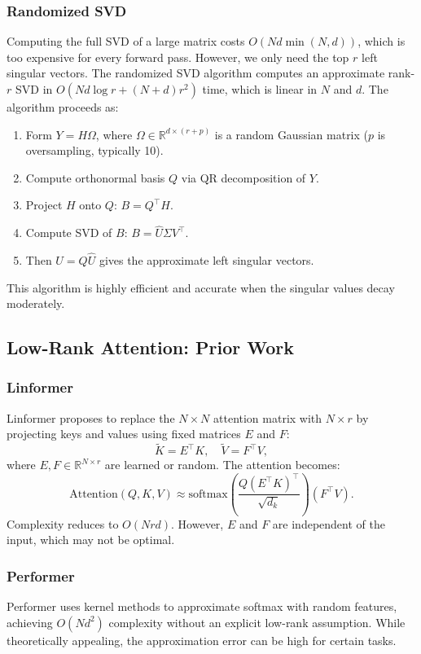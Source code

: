 \subsubsection{Randomized SVD}
Computing the full SVD of a large matrix costs $O(N d \min(N,d))$, which is too expensive for every forward pass. However, we only need the top $r$ left singular vectors. The randomized SVD algorithm \cite{halko2011finding} computes an approximate rank-$r$ SVD in $O(N d \log r + (N+d) r^2)$ time, which is linear in $N$ and $d$. The algorithm proceeds as:
\begin{enumerate}
    \item Form $Y = H \Omega$, where $\Omega \in \mathbb{R}^{d \times (r+p)}$ is a random Gaussian matrix ($p$ is oversampling, typically 10).
    \item Compute orthonormal basis $Q$ via QR decomposition of $Y$.
    \item Project $H$ onto $Q$: $B = Q^\top H$.
    \item Compute SVD of $B$: $B = \hat{U} \Sigma V^\top$.
    \item Then $U = Q \hat{U}$ gives the approximate left singular vectors.
\end{enumerate}
This algorithm is highly efficient and accurate when the singular values decay moderately.

\subsection{Low-Rank Attention: Prior Work}
\subsubsection{Linformer}
Linformer \cite{wang2020linformer} proposes to replace the $N \times N$ attention matrix with $N \times r$ by projecting keys and values using fixed matrices $E$ and $F$:
\[
\tilde{K} = E^\top K,\quad \tilde{V} = F^\top V,
\]
where $E, F \in \mathbb{R}^{N \times r}$ are learned or random. The attention becomes:
\[
\text{Attention}(Q,K,V) \approx \text{softmax}\left( \frac{Q (E^\top K)^\top}{\sqrt{d_k}} \right) (F^\top V).
\]
Complexity reduces to $O(N r d)$. However, $E$ and $F$ are independent of the input, which may not be optimal.

\subsubsection{Performer}
Performer \cite{choromanski2020rethinking} uses kernel methods to approximate softmax with random features, achieving $O(N d^2)$ complexity without an explicit low-rank assumption. While theoretically appealing, the approximation error can be high for certain tasks.

